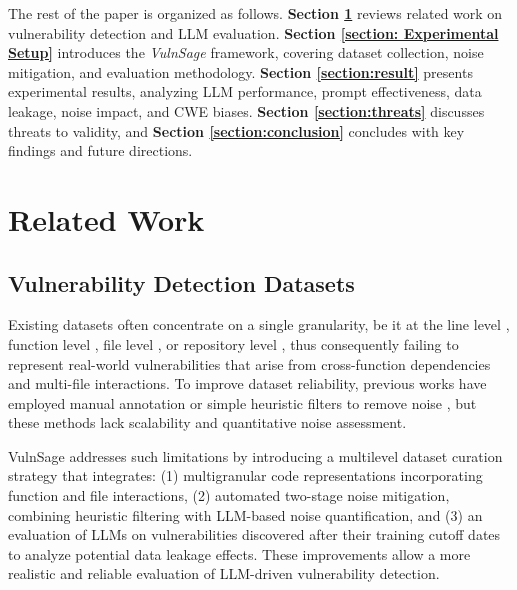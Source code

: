 \documentclass[sigconf]{acmart}
\begin{document}
The rest of the paper is organized as follows. \textbf{Section \ref{section:related_work}} reviews related work on vulnerability detection and LLM evaluation. \textbf{Section \ref{section: Experimental Setup}} introduces the \textit{VulnSage} framework, covering dataset collection, noise mitigation, and evaluation methodology. \textbf{Section \ref{section:result}} presents experimental results, analyzing LLM performance, prompt effectiveness, data leakage, noise impact, and CWE biases. \textbf{Section \ref{section:threats}} discusses threats to validity, and \textbf{Section \ref{section:conclusion}} concludes with key findings and future directions.

\section{Related Work}
\label{section:related_work}

\subsection{Vulnerability Detection Datasets}

Existing datasets often concentrate on a single granularity, be it at the line level \cite{fu2022linevul}, function level \cite{zhou2019devign, chakraborty2021deep, chen2023diversevul}, file level \cite{liu2024vuldetectbench}, or repository level \cite{zhou2024comparison}, thus consequently failing to represent real-world vulnerabilities that arise from cross-function dependencies and multi-file interactions.
To improve dataset reliability, previous works have employed manual annotation or simple heuristic filters to remove noise \cite{zhou2019devign, hommersom2024automated, gao2023far}, but these methods lack scalability and quantitative noise assessment. 

VulnSage addresses such limitations by introducing a multilevel dataset curation strategy that integrates: (1) multigranular code representations incorporating function and file interactions, (2) automated two-stage noise mitigation, combining heuristic filtering with LLM-based noise quantification, and (3) an evaluation of LLMs on vulnerabilities discovered after their training cutoff dates to analyze potential data leakage effects. These improvements allow a more realistic and reliable evaluation of LLM-driven vulnerability detection.
\end{document}
